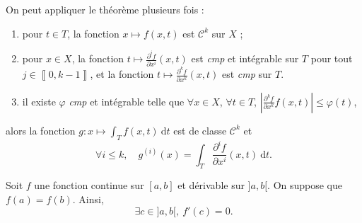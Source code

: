 \begin{crlr}
	On peut appliquer le théorème plusieurs fois : 
	\begin{enumerate}
		\item pour $t \in T$, la fonction $x \mapsto f(x,t)$\/ est $\mathcal{C}^k$\/ sur $X$\/ ;
		\item pour $x \in X$, la fonction $t \mapsto \frac{\partial^i f}{\partial x^i}(x,t)$\/ est \textit{cmp} et intégrable sur $T$\/ pour tout $j \in \left\llbracket 0,k-1 \right\rrbracket$, et la fonction $t \mapsto \frac{\partial^k f}{\partial x^k}(x,t)$\/ est \textit{cmp} sur $T$.
		\item il existe $\varphi$\/  \textit{cmp} et intégrable telle que $\forall x \in X$, $\forall t \in T$, $\left| \frac{\partial^k f}{\partial x^k} f(x,t) \right| \le \varphi(t)$,
	\end{enumerate}
	alors la fonction $g : x \mapsto \int_{T} f(x,t) ~\mathrm{d}t$\/ est de classe $\mathcal{C}^k$\/ et \[
		\forall i \le k,\quad g^{(i)}(x) = \int_{T} \frac{\partial^i f}{\partial x^i} (x,t)~\mathrm{d}t
	.\]
\end{crlr}

\begin{rap}
	Soit $f$\/ une fonction continue sur $[a,b]$\/ et dérivable sur $]a,b[$. On suppose que $f(a) = f(b)$. Ainsi, \[
		\exists c \in {]a,b[},\:f'(c) = 0
	.\]
\end{rap}

